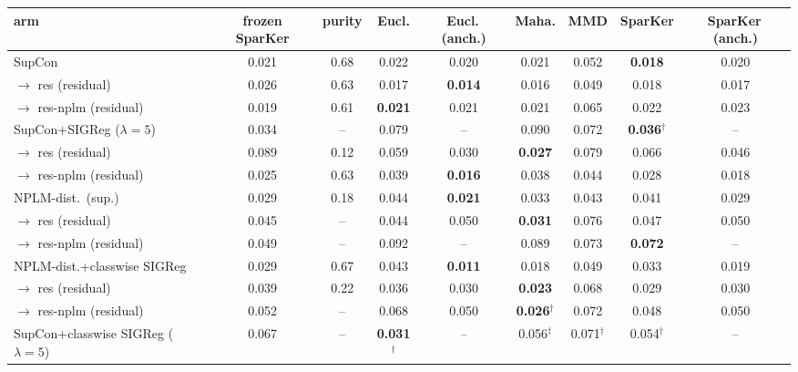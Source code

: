 \begin{table}[t]
\centering
\footnotesize
\begin{tabular}{lcccccccc}
\toprule
arm & frozen SparKer & purity & Eucl. & Eucl.\,(anch.) & Maha. & MMD & SparKer & SparKer\,(anch.) \\
\midrule
SupCon & 0.021 & 0.68 & 0.022 & 0.020 & 0.021 & 0.052 & \textbf{0.018} & 0.020 \\
\quad $\to$ res (residual) & 0.026 & 0.63 & 0.017 & \textbf{0.014} & 0.016 & 0.049 & 0.018 & 0.017 \\
\quad $\to$ res-nplm (residual) & 0.019 & 0.61 & \textbf{0.021} & 0.021 & 0.021 & 0.065 & 0.022 & 0.023 \\
\addlinespace
SupCon+SIGReg ($\lambda{=}5$) & 0.034 & -- & 0.079 & -- & 0.090 & 0.072 & \textbf{0.036$^\dagger$} & -- \\
\quad $\to$ res (residual) & 0.089 & 0.12 & 0.059 & 0.030 & \textbf{0.027} & 0.079 & 0.066 & 0.046 \\
\quad $\to$ res-nplm (residual) & 0.025 & 0.63 & 0.039 & \textbf{0.016} & 0.038 & 0.044 & 0.028 & 0.018 \\
\addlinespace
NPLM-dist.\ (sup.) & 0.029 & 0.18 & 0.044 & \textbf{0.021} & 0.033 & 0.043 & 0.041 & 0.029 \\
\quad $\to$ res (residual) & 0.045 & -- & 0.044 & 0.050 & \textbf{0.031} & 0.076 & 0.047 & 0.050 \\
\quad $\to$ res-nplm (residual) & 0.049 & -- & 0.092 & -- & 0.089 & 0.073 & \textbf{0.072} & -- \\
\addlinespace
NPLM-dist.+classwise SIGReg & 0.029 & 0.67 & 0.043 & \textbf{0.011} & 0.018 & 0.049 & 0.033 & 0.019 \\
\quad $\to$ res (residual) & 0.039 & 0.22 & 0.036 & 0.030 & \textbf{0.023} & 0.068 & 0.029 & 0.030 \\
\quad $\to$ res-nplm (residual) & 0.052 & -- & 0.068 & 0.050 & \textbf{0.026$^\dagger$} & 0.072 & 0.048 & 0.050 \\
\addlinespace
SupCon+classwise SIGReg ($\lambda{=}5$) & 0.067 & -- & \textbf{0.031$^\dagger$} & -- & 0.056$^\dagger$ & 0.071$^\dagger$ & 0.054$^\dagger$ & -- \\

\end{tabular}
\end{table}

